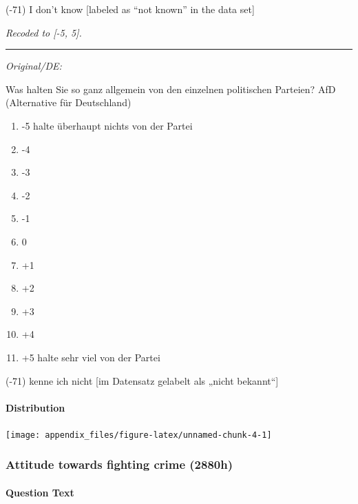 \documentclass[
]{article}
\providecommand{\tightlist}{%
  \setlength{\itemsep}{0pt}\setlength{\parskip}{0pt}}
\begin{document}
(-71) I don't know {[}labeled as ``not known'' in the data set{]}

\emph{Recoded to {[}-5, 5{]}.}

\begin{center}\rule{0.5\linewidth}{0.5pt}\end{center}

\emph{Original/DE:}

Was halten Sie so ganz allgemein von den einzelnen politischen Parteien? AfD (Alternative für Deutschland)

\begin{enumerate}
\def\labelenumi{(\arabic{enumi})}
\tightlist
\item
  -5 halte überhaupt nichts von der Partei
\item
  -4
\item
  -3
\item
  -2
\item
  -1
\item
  0
\item
  +1
\item
  +2
\item
  +3
\item
  +4
\item
  +5 halte sehr viel von der Partei
\end{enumerate}

(-71) kenne ich nicht {[}im Datensatz gelabelt als „nicht bekannt``{]}

\hypertarget{distribution-3}{%
\paragraph{Distribution}\label{distribution-3}}

\begin{center}\texttt{[image: appendix\_files/figure-latex/unnamed-chunk-4-1]} \end{center}

\hypertarget{attitude-towards-fighting-crime-2880h}{%
\subsubsection{Attitude towards fighting crime (2880h)}\label{attitude-towards-fighting-crime-2880h}}

\hypertarget{question-text-4}{%
\paragraph{Question Text}\label{question-text-4}}
\end{document}
